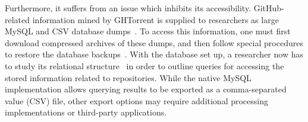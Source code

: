 Furthermore, it suffers from an issue which inhibits its accessibility.
GitHub-related information mined by GHTorrent is supplied to researchers as large MySQL and CSV database dumps~\cite{GHTDUMPS}.
To access this information, one must first download compressed archives of these dumps, and then follow special procedures to restore the database backups~\cite{GHTRESTORE}.
With the database set up, a researcher now has to study its relational structure~\cite{GHTSCHEMA} in order to outline queries for accessing the stored information related to repositories.
While the native MySQL implementation allows querying results to be exported as a comma-separated value (CSV) file, other export options may require additional processing implementations or third-party applications.
